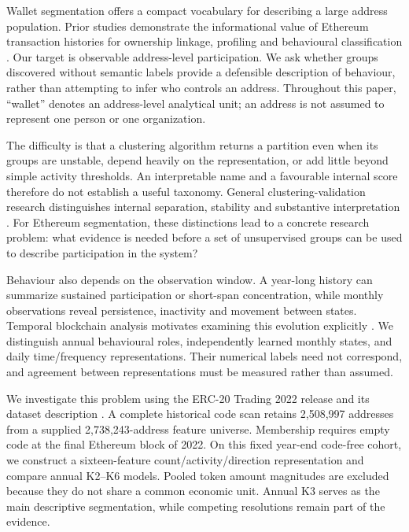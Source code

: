 \documentclass[journal,letterpaper]{IEEEtran}
\begin{document}
Wallet segmentation offers a compact vocabulary for describing a large address population. Prior studies demonstrate the informational value of Ethereum transaction histories for ownership linkage, profiling and behavioural classification \cite{victor2020address,beres2021blockchain,bonifazi2022userspectra}. Our target is observable address-level participation. We ask whether groups discovered without semantic labels provide a defensible description of behaviour, rather than attempting to infer who controls an address. Throughout this paper, ``wallet'' denotes an address-level analytical unit; an address is not assumed to represent one person or one organization.

The difficulty is that a clustering algorithm returns a partition even when its groups are unstable, depend heavily on the representation, or add little beyond simple activity thresholds. An interpretable name and a favourable internal score therefore do not establish a useful taxonomy. General clustering-validation research distinguishes internal separation, stability and substantive interpretation \cite{halkidi2001validation,liu2022stability}. For Ethereum segmentation, these distinctions lead to a concrete research problem: what evidence is needed before a set of unsupervised groups can be used to describe participation in the system?

Behaviour also depends on the observation window. A year-long history can summarize sustained participation or short-span concentration, while monthly observations reveal persistence, inactivity and movement between states. Temporal blockchain analysis motivates examining this evolution explicitly \cite{agarwal2021temporal}. We distinguish annual behavioural roles, independently learned monthly states, and daily time/frequency representations. Their numerical labels need not correspond, and agreement between representations must be measured rather than assumed.

We investigate this problem using the ERC-20 Trading 2022 release and its dataset description \cite{somin2025erc2022,somin2025dataset}. A complete historical code scan retains 2,508,997 addresses from a supplied 2,738,243-address feature universe. Membership requires empty code at the final Ethereum block of 2022. On this fixed year-end code-free cohort, we construct a sixteen-feature count/activity/direction representation and compare annual K2--K6 models. Pooled token amount magnitudes are excluded because they do not share a common economic unit. Annual K3 serves as the main descriptive segmentation, while competing resolutions remain part of the evidence.
\end{document}
